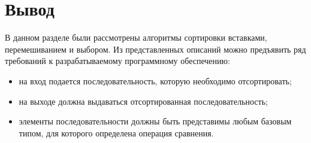 \section{Вывод}

В данном разделе были рассмотрены алгоритмы сортировки вставками,
перемешиванием и выбором. Из представленных описаний можно предъявить ряд
требований к разрабатываемому программному обеспечению:
\begin{itemize}[left=\parindent]
    \item на вход подается последовательность, которую необходимо
          отсортировать;
    \item на выходе должна выдаваться отсортированная последовательность;
    \item элементы последовательности должны быть представимы любым базовым
        типом, для которого определена операция сравнения.
\end{itemize}
